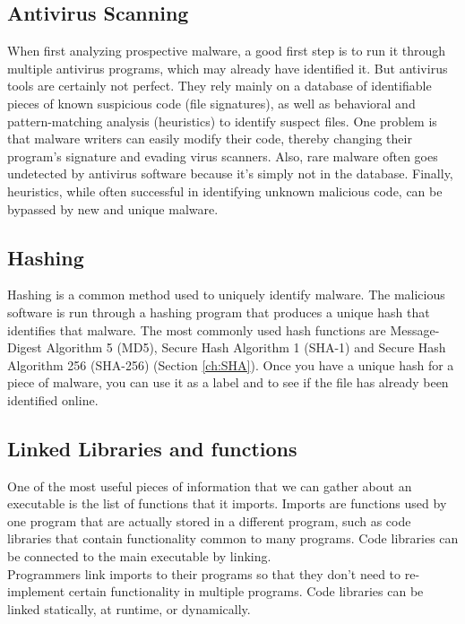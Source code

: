 \subsection{Antivirus Scanning}
When first analyzing prospective malware, a good first step is to run it through multiple antivirus programs, which may already have identified it. But antivirus tools are certainly not perfect. They rely mainly on a database of identifiable pieces of known suspicious code (file signatures), as well as behavioral and pattern-matching analysis (heuristics) to identify suspect files. One problem is that malware writers can easily modify their code, thereby changing their program’s signature and evading virus scanners. Also, rare malware often goes undetected by antivirus software because it’s simply not in the database. Finally, heuristics, while often successful in identifying unknown malicious code, can be bypassed by new and unique malware.

\subsection{Hashing}
Hashing is a common method used to uniquely identify malware. The malicious software is run through a hashing program that produces a unique hash that identifies that malware. The most commonly used hash functions are Message-Digest Algorithm 5 (MD5), Secure Hash Algorithm 1 (SHA-1) and Secure Hash Algorithm 256 (SHA-256) (Section \ref{ch:SHA}). Once you have a unique hash for a piece of malware, you can use it as a label and to see if the file has already been identified online.

\subsection{Linked Libraries and functions}
One of the most useful pieces of information that we can gather about an executable is the list of functions that it imports. Imports are functions used by one program that are actually stored in a different program, such as code libraries that contain functionality common to many programs. Code libraries can be connected to the main executable by linking. \\
Programmers link imports to their programs so that they don’t need to re-implement certain functionality in multiple programs. Code libraries can be linked statically, at runtime, or dynamically.

